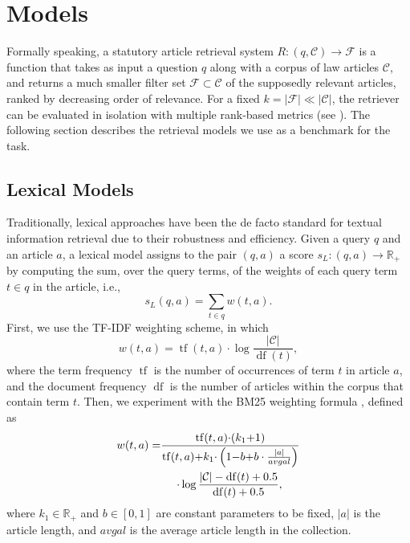 \documentclass[11pt]{article}
\begin{document}
\section{Models \label{sec:models}}
Formally speaking, a statutory article retrieval system $R: (q, \mathcal{C}) \rightarrow \mathcal{F}$ is a function that takes as input a question $q$ along with a corpus of law articles $\mathcal{C}$, and returns a much smaller filter set $\mathcal{F} \subset \mathcal{C}$ of the supposedly relevant articles, ranked by decreasing order of relevance. For a fixed $k=\left|\mathcal{F}\right|\ll|\mathcal{C}|$, the retriever can be evaluated in isolation with multiple rank-based metrics (see ). The following section describes the retrieval models we use as a benchmark for the task.

\subsection{Lexical Models}
Traditionally, lexical approaches have been the de facto standard for textual information retrieval due to their robustness and efficiency. Given a query $q$ and an article $a$, a lexical model assigns to the pair $(q, a)$ a score $s_L: (q, a) \rightarrow \mathbb{R}_+$ by computing the sum, over the query terms, of the weights of each query term $t \in q$ in the article, i.e.,
\begin{equation}
    s_L(q, a) = \sum_{t \in q} w(t, a).
\end{equation}
First, we use the TF-IDF weighting scheme, in which
\begin{equation}
    w(t, a) = \operatorname{tf}(t, a) \cdot \log \frac{|\mathcal{C}|}{\operatorname{df}(t)},
\end{equation}
where the term frequency $\operatorname{tf}$ is the number of occurrences of term $t$ in article $a$, and the document frequency $\operatorname{df}$ is the number of articles within the corpus that contain term $t$. Then, we experiment with the BM25 weighting formula \citep{robertson1994okapi}, defined as
\begin{equation}
\begin{split}
    w(t, a)=&\frac{\operatorname{tf}(t, a){\cdot} (k_1{+}1)}{\operatorname{tf}(t, a){+}k_1{\cdot}\left(1{-}b{+}b\cdot \frac{|a|}{avgal}\right)}\\
            &\hspace{0.5cm}{\cdot}\log \frac{|\mathcal{C}|-\operatorname{df}(t)+0.5}{\operatorname{df}(t)+0.5},
\end{split}
\end{equation}
where $k_1 \in \mathbb{R}_+$ and $b \in [0,1]$ are constant parameters to be fixed, $|a|$ is the article length, and $avgal$ is the average article length in the collection.
\end{document}
